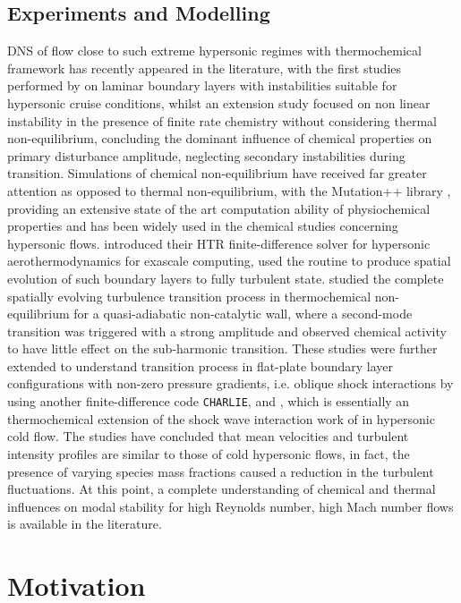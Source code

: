 \subsection{Experiments and Modelling}
\gls{DNS} of flow close to such extreme hypersonic regimes with thermochemical framework has recently appeared in the literature, with the first studies performed by \cite{marxen2013} on laminar boundary layers with instabilities suitable for hypersonic cruise conditions, whilst an extension study \citep{marxeniaccarinomagin2014} focused on non linear instability in the presence of finite rate chemistry without considering thermal non-equilibrium, concluding the dominant influence of chemical properties on primary disturbance amplitude, neglecting secondary instabilities during transition. Simulations of chemical non-equilibrium have received far greater attention as opposed to thermal non-equilibrium, with the Mutation++ library \cite{Scoggins2020}, providing an extensive state of the art computation ability of physiochemical properties and has been widely used in the chemical studies concerning hypersonic flows. \cite{DiRenzo2020} introduced their HTR finite-difference solver for hypersonic aerothermodynamics for exascale computing, \cite{direnzourzay2021} used the routine to produce spatial evolution of such boundary layers to fully turbulent state. \cite{Passiatore2021} studied the complete spatially evolving turbulence transition process in thermochemical non-equilibrium for a quasi-adiabatic non-catalytic wall, where a second-mode transition was triggered with a strong amplitude and observed chemical activity to have little effect on the sub-harmonic transition. These studies were further extended to understand transition process in flat-plate boundary layer configurations with non-zero pressure gradients, i.e. oblique shock interactions by \citep{Volpiani2021} using another finite-difference code \texttt{CHARLIE}, and \cite{passiatore2023}, which is essentially an thermochemical extension of the shock wave interaction work of \cite{sandham2014} in hypersonic cold flow. The studies have concluded that mean velocities and turbulent intensity profiles are similar to those of cold hypersonic flows, in fact, the presence of varying species mass fractions caused a reduction in the turbulent fluctuations. At this point,  a complete understanding of chemical and thermal influences on modal stability for high Reynolds number, high Mach number flows is available in the literature. 

\section{Motivation}

